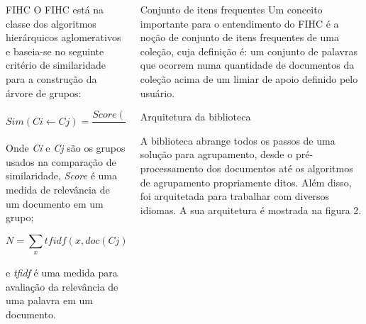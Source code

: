 \documentclass[final]{beamer}
\newlength{\onecolwid}
\newlength{\twocolwid}
\begin{document}
\begin{frame}[t]
\begin{columns}[t]
\begin{column}{\twocolwid}
\begin{columns}[t,totalwidth=\twocolwid]
\begin{column}{\onecolwid}
\begin{block}{FIHC}
O FIHC está na classe dos algoritmos hierárquicos aglomerativos e baseia-se no seguinte critério de similaridade para a construção da árvore de grupos:

\begin{equation}
Sim(Ci \gets Cj) = \frac{Score(Ci \gets doc(Cj))}{N} + 1
\label{eqn:Sim}
\end{equation}

Onde \textit{Ci} e \textit{Cj} são os grupos usados na comparação de similaridade, \textit{Score} é uma medida de relevância de um documento em um grupo;

\begin{equation}
N = \sum_{x}tfidf(x, doc(Cj)) + \sum_{x'}tfidf(x', doc(Cj))
\label{eqn:Sim_N}
\end{equation}

e \textit{tfidf} é uma medida para avaliação da relevância de uma palavra em um documento.

\end{block}


\end{column} %

\begin{column}{\onecolwid}\vspace{-.6in} %


\begin{block}{Conjunto de itens frequentes}
Um conceito importante para o entendimento do FIHC é a noção de conjunto de itens frequentes de uma coleção, cuja definição é: um conjunto de palavras que ocorrem numa quantidade de documentos da coleção acima de um limiar de apoio definido pelo usuário.
\end{block}

\begin{block}{Arquitetura da biblioteca}

A biblioteca abrange todos os passos de uma solução para agrupamento, desde o pré-processamento dos documentos até os algoritmos de agrupamento propriamente ditos. Além disso, foi arquitetada para trabalhar com diversos idiomas. A sua arquitetura é mostrada na figura 2.


\end{block}
\end{column}
\end{columns}
\end{column}
\end{columns}
\end{frame}
\end{document}
